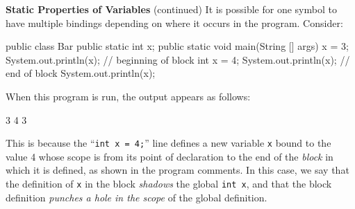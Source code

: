 \begin{minipage}[t]{\sw}
\slidenumber
\LARGE
{\bf Static Properties of Variables} (continued)\exx
\Large
It is possible for one symbol to have multiple bindings
depending on where it occurs in the program.
Consider:
{\Large
\begin{qv}
public class Bar {
  public static int x;
  public static void main(String [] args) {
    x = 3;
    System.out.println(x);
    { // beginning of block
      int x = 4;
      System.out.println(x);
    } // end of block
    System.out.println(x);
  }
}
\end{qv}
}
When this program is run, the output appears as follows:
\vspace{-0.75ex}
\begin{qv}
3
4
3
\end{qv}
\vspace{-0.75ex}
This is because the ``\verb'int x = 4;''' line defines
a new variable \verb'x' bound to the value 4
whose scope is from its point of declaration
to the end of the {\em block} in which it is defined,
as shown in the program comments.
In this case, we say that the definition of \verb'x' in the block
{\em shadows} the global \verb'int x',
and that the block definition
{\em punches a hole in the scope} of the global definition.
\end{minipage}
\clearpage
